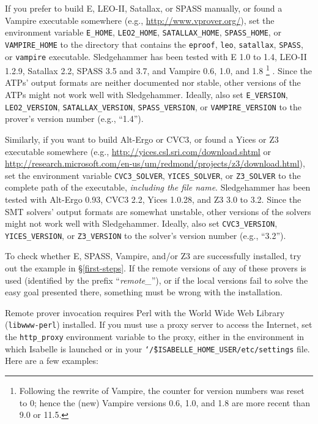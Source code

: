 \documentclass[a4paper,12pt]{article}
\begin{document}
\begin{sloppy}
\begin{enum}
\item[\labelitemi] If you prefer to build E, LEO-II, Satallax, or SPASS
manually, or found a Vampire executable somewhere (e.g.,
\url{http://www.vprover.org/}), set the environment variable \texttt{E\_HOME},
\texttt{LEO2\_HOME}, \texttt{SATALLAX\_HOME}, \texttt{SPASS\_HOME}, or
\texttt{VAMPIRE\_HOME} to the directory that contains the \texttt{eproof},
\texttt{leo}, \texttt{satallax}, \texttt{SPASS}, or \texttt{vampire} executable.
Sledgehammer has been tested with E 1.0 to 1.4, LEO-II 1.2.9, Satallax 2.2,
SPASS 3.5 and 3.7, and Vampire 0.6, 1.0, and 1.8%
\footnote{Following the rewrite of Vampire, the counter for version numbers was
reset to 0; hence the (new) Vampire versions 0.6, 1.0, and 1.8 are more recent
than 9.0 or 11.5.}%
. Since the ATPs' output formats are neither documented nor stable, other
versions of the ATPs might not work well with Sledgehammer. Ideally,
also set \texttt{E\_VERSION}, \texttt{LEO2\_VERSION},
\texttt{SATALLAX\_VERSION}, \texttt{SPASS\_VERSION}, or
\texttt{VAMPIRE\_VERSION} to the prover's version number (e.g., ``1.4'').

Similarly, if you want to build Alt-Ergo or CVC3, or found a
Yices or Z3 executable somewhere (e.g.,
\url{http://yices.csl.sri.com/download.shtml} or
\url{http://research.microsoft.com/en-us/um/redmond/projects/z3/download.html}),
set the environment variable \texttt{CVC3\_\allowbreak SOLVER},
\texttt{YICES\_SOLVER}, or \texttt{Z3\_SOLVER} to the complete path of
the executable, \emph{including the file name}. Sledgehammer has been tested
with Alt-Ergo 0.93, CVC3 2.2, Yices 1.0.28, and Z3 3.0 to 3.2.
Since the SMT solvers' output formats are somewhat unstable, other
versions of the solvers might not work well with Sledgehammer. Ideally,
also set \texttt{CVC3\_VERSION}, \texttt{YICES\_VERSION}, or
\texttt{Z3\_VERSION} to the solver's version number (e.g., ``3.2'').
\end{enum}
\end{sloppy}

To check whether E, SPASS, Vampire, and/or Z3 are successfully installed, try
out the example in \S\ref{first-steps}. If the remote versions of any of these
provers is used (identified by the prefix ``\emph{remote\_\/}''), or if the
local versions fail to solve the easy goal presented there, something must be
wrong with the installation.

Remote prover invocation requires Perl with the World Wide Web Library
(\texttt{libwww-perl}) installed. If you must use a proxy server to access the
Internet, set the \texttt{http\_proxy} environment variable to the proxy, either
in the environment in which Isabelle is launched or in your
\texttt{\char`\~/\$ISABELLE\_HOME\_USER/etc/settings} file. Here are a few
examples:
\end{document}
